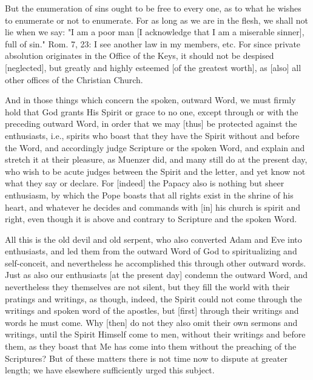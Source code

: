 But the enumeration of sins ought to be free to every one, as
to what he wishes to enumerate or not to enumerate. For as
long as we are in the flesh, we shall not lie when we say: "I
am a poor man [I acknowledge that I am a miserable sinner],
full of sin." Rom. 7, 23: I see another law in my members,
etc. For since private absolution originates in the Office of
the Keys, it should not be despised [neglected], but greatly
and highly esteemed [of the greatest worth], as [also] all
other offices of the Christian Church.

And in those things which concern the spoken, outward Word, we
must firmly hold that God grants His Spirit or grace to no
one, except through or with the preceding outward Word, in
order that we may [thus] be protected against the enthusiasts,
i.e., spirits who boast that they have the Spirit without and
before the Word, and accordingly judge Scripture or the spoken
Word, and explain and stretch it at their pleasure, as Muenzer
did, and many still do at the present day, who wish to be
acute judges between the Spirit and the letter, and yet know
not what they say or declare. For [indeed] the Papacy also is
nothing but sheer enthusiasm, by which the Pope boasts that
all rights exist in the shrine of his heart, and whatever he
decides and commands with [in] his church is spirit and right,
even though it is above and contrary to Scripture and the
spoken Word.

All this is the old devil and old serpent, who also converted
Adam and Eve into enthusiasts, and led them from the outward
Word of God to spiritualizing and self-conceit, and
nevertheless he accomplished this through other outward words.
Just as also our enthusiasts [at the present day] condemn the
outward Word, and nevertheless they themselves are not silent,
but they fill the world with their pratings and writings, as
though, indeed, the Spirit could not come through the writings
and spoken word of the apostles, but [first] through their
writings and words he must come. Why [then] do not they also
omit their own sermons and writings, until the Spirit Himself
come to men, without their writings and before them, as they
boast that Me has come into them without the preaching of the
Scriptures? But of these matters there is not time now to
dispute at greater length; we have elsewhere sufficiently
urged this subject.

